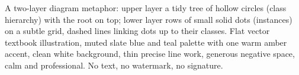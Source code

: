 A two-layer diagram metaphor: upper layer a tidy tree of hollow circles (class hierarchy) with the root on top; lower layer rows of small solid dots (instances) on a subtle grid, dashed lines linking dots up to their classes. Flat vector textbook illustration, muted slate blue and teal palette with one warm amber accent, clean white background, thin precise line work, generous negative space, calm and professional. No text, no watermark, no signature.
